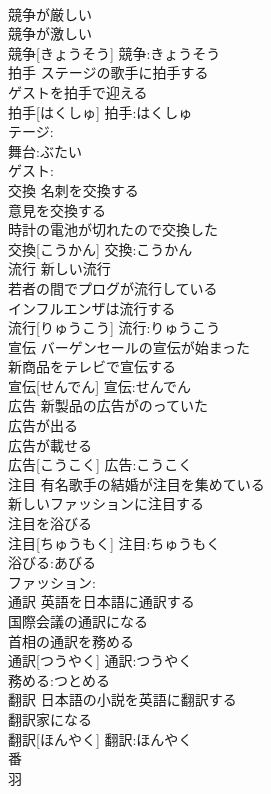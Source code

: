 \documentclass[8pt]{extreport}
\begin{document}
\begin{CJK}{UTF8}{min}
\\	競争が厳しい 
\\	競争が激しい 
\\	競争[きょうそう]			競争:きょうそう
\\	拍手	ステージの歌手に拍手する 
\\	ゲストを拍手で迎える 
\\	拍手[はくしゅ]			拍手:はくしゅ
\\	テージ:
\\	舞台:ぶたい
\\	ゲスト:
\\	交換	名刺を交換する 
\\	意見を交換する 
\\	時計の電池が切れたので交換した 
\\	交換[こうかん]			交換:こうかん
\\	流行	新しい流行 
\\	若者の間でプログが流行している 
\\	インフルエンザは流行する 
\\	流行[りゅうこう]			流行:りゅうこう
\\	宣伝	バーゲンセールの宣伝が始まった 
\\	新商品をテレビで宣伝する 
\\	宣伝[せんでん]			宣伝:せんでん
\\	広告	新製品の広告がのっていた 
\\	広告が出る 
\\	広告が載せる 
\\	広告[こうこく]			広告:こうこく
\\	注目	有名歌手の結婚が注目を集めている 
\\	新しいファッションに注目する 
\\	注目を浴びる 
\\	注目[ちゅうもく]			注目:ちゅうもく
\\	浴びる:あびる
\\	ファッション:
\\	通訳	英語を日本語に通訳する 
\\	国際会議の通訳になる 
\\	首相の通訳を務める 
\\	通訳[つうやく]			通訳:つうやく
\\	務める:つとめる
\\	翻訳	日本語の小説を英語に翻訳する 
\\	翻訳家になる 
\\	翻訳[ほんやく]			翻訳:ほんやく
\\	番 
\\	羽 

\end{CJK}
\end{document}
